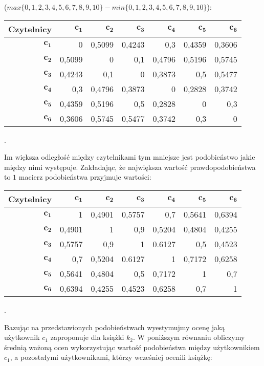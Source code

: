\documentclass[12pt,a4paper]{report}
\begin{document}
($max\{0,1,2,3,4,5,6,7,8,9,10\} - min\{0,1,2,3,4,5,6,7,8,9,10\}$):
\begin{center}
\begin{tabular}{|r|r|r|r|r|r|r|} \hline
\textbf{Czytelnicy} & $\mathbf{c_1}$ & $\mathbf{c_2}$ & $\mathbf{c_3}$ & $\mathbf{c_4}$ & $\mathbf{c_5}$ & $\mathbf{c_6}$ \\
\hline
$\mathbf{c_1}$ & 0 & 0,5099 & 0,4243 & 0,3 & 0,4359 & 0,3606 \\
\hline
$\mathbf{c_2}$ & 0,5099 & 0 & 0,1 & 0,4796 & 0,5196 & 0,5745 \\
\hline
$\mathbf{c_3}$ & 0,4243 & 0,1 & 0 & 0,3873 & 0,5 & 0,5477 \\
\hline
$\mathbf{c_4}$ & 0,3 & 0,4796 & 0,3873 & 0 & 0,2828 & 0,3742 \\ 
\hline 
$\mathbf{c_5}$ & 0,4359 & 0,5196 & 0,5 & 0,2828 & 0 & 0,3 \\
\hline 
$\mathbf{c_6}$ & 0,3606 & 0,5745 & 0,5477 & 0,3742 & 0,3 & 0 \\ 
\hline 
\end{tabular}.
\end{center}
Im większa odległość między czytelnikami tym mniejsze jest podobieństwo jakie między nimi występuje.
Zakładając, że największa wartość prawdopodobieństwa to $1$ macierz podobieństwa przyjmuje wartości:
\begin{center}
\begin{tabular}{|r|r|r|r|r|r|r|} \hline
\textbf{Czytelnicy} & $\mathbf{c_1}$ & $\mathbf{c_2}$ & $\mathbf{c_3}$ & $\mathbf{c_4}$ & $\mathbf{c_5}$ & $\mathbf{c_6}$ \\
\hline
$\mathbf{c_1}$ & 1 & 0,4901 & 0,5757 & 0,7 & 0,5641 & 0,6394 \\
\hline
$\mathbf{c_2}$ & 0,4901 & 1 & 0,9 & 0,5204 & 0,4804 & 0,4255 \\
\hline
$\mathbf{c_3}$ & 0,5757 & 0,9 & 1 & 0.6127 & 0,5 & 0,4523 \\
\hline
$\mathbf{c_4}$ & 0,7 & 0,5204 & 0.6127 & 1 & 0,7172 & 0,6258 \\ 
\hline 
$\mathbf{c_5}$ & 0,5641 & 0,4804 & 0,5 & 0,7172 & 1 & 0,7 \\
\hline 
$\mathbf{c_6}$ & 0,6394 & 0,4255 & 0,4523 & 0,6258 & 0,7 & 1 \\ 
\hline 
\end{tabular}.
\end{center}
Bazując na przedstawionych podobieństwach wyestymujmy ocenę jaką użytkownik $c_1$ zaproponuje dla książki $k_2$. W poniższym równaniu obliczymy średnią ważoną ocen wykorzystując wartość podobieństwa między użytkownikiem $c_1$, a pozostałymi użytkownikami, którzy wcześniej ocenili książkę:
\end{document}
